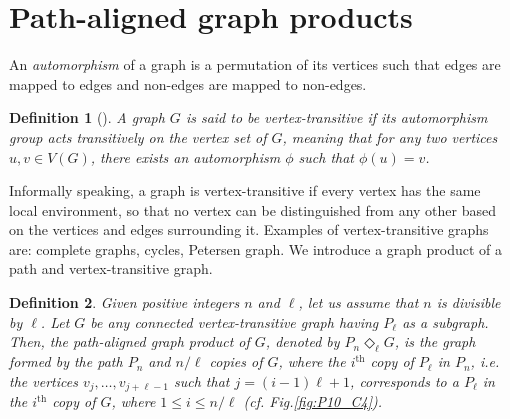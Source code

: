 \documentclass{article}
\newtheorem{definition}{Definition}
\begin{document}
\section{Path-aligned graph products} \label{sec:pathalignedproducts}

An \emph{automorphism} of a graph is a permutation of its vertices such that edges are mapped to edges and non-edges are mapped to non-edges.

\begin{definition}[\cite{GoRo13}]
\emph{A graph $G$ is said to be} vertex-transitive \emph{if its automorphism group acts transitively on the vertex set of $G$, meaning that for any two vertices $u, v \in V(G)$, there exists an automorphism $\phi$ such that $\phi(u)=v$.}
\end{definition}

Informally speaking, a graph is vertex-transitive if every vertex has the same local environment, so that no vertex can be distinguished from any other based on the vertices and edges surrounding it. Examples of vertex-transitive graphs are: complete graphs, cycles, Petersen graph.
We introduce a graph product of a path and vertex-transitive graph.

\begin{definition}
\emph{Given positive integers $n$ and $\ell$, let us assume that $n$ is divisible by $\ell$. Let \( G \) be any connected vertex-transitive graph having $P_{\ell}$ as a subgraph.
Then, the} path-aligned graph product of $G$\emph{, denoted by
\( P_n \Diamond_{\ell} G \), is the graph formed by the path \( P_n \) and \(  n/\ell  \) copies of \( G \), where the $i^{\text{th}}$ copy of $P_{\ell}$ in $P_n$, i.e. the vertices \( v_j, \ldots, v_{j+\ell-1} \) such that \( j = (i-1)\ell + 1 \),  corresponds to a $P_\ell$ in the $i^{\text{th}}$ copy of \( G \), where $1 \leq i\leq n/\ell$ (cf. Fig.\ref{fig:P10_C4}).} \label{aligned_cycles}
\end{definition}


\end{document}
